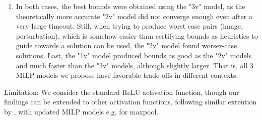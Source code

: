 \begin{enumerate}
\item In both cases, the best bounds were obtained using the "3v" model, as the theoretically more accurate "2v" model did not converge enough even after a very large timeout. Still, when trying to produce worst case pairs (image, perturbation), which is somehow easier than certifying bounds as heuristics to guide towards a solution can be used, the "2v" model found worser-case solutions. Last, the "1v" model produced bounds as good as the "2v" models and much faster than the "3v" models, although slightly larger. That is, all 3 MILP models we propose have favorable trade-offs in different contexts.
\end{enumerate}

Limitation: We consider the standard ReLU activation function, though our findings can be extended to other activation functions, following similar extention by \cite{DivideAndSlide}, with updated MILP models e.g. for maxpool. 



